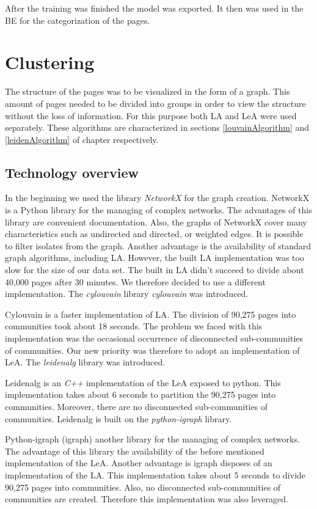 After the training was finished the model was exported. It then was used in the BE for the categorization of the pages.

\section{Clustering}\label{ClusteringDevelopment}
The structure of the pages was to be visualized in the form of a graph. This amount of pages needed to be divided into groups in order to view the structure without the loss of information. For this purpose both LA and LeA were used separately. These algorithms are characterized in sections \ref{louvainAlgorithm} and \ref{leidenAlgorithm} of chapter respectively. 

\subsection{Technology overview} \label{ClusteringTechonologyOverview}
In the beginning we used the library \textit{NetworkX} \cite{networkX} for the graph creation. NetworkX is a Python library for the managing of complex networks. The advantages of this library are convenient documentation. Also, the graphs of NetworkX cover many characteristics such as undirected and directed, or weighted edges. It is possible to filter isolates from the graph.  Another advantage is the availability of standard graph algorithms, including LA. However, the built LA implementation was too slow for the size of our data set. The built in LA didn't succeed to divide about 40,000 pages after 30 minutes. We therefore decided to use a different implementation. The \textit{cylouvain} library \textit{cylouvain} was introduced. 

Cylouvain is a faster implementation of LA. The division of 90,275 pages into communities took about 18 seconds. The problem we faced with this implementation was the occasional occurrence of disconnected sub-communities of communities. Our new priority was therefore to adopt an implementation of LeA. The \textit{leidenalg} \cite{leidenalg} library was introduced.

Leidenalg is an \textit{C++} implementation of the LeA exposed to python. This implementation takes about 6 seconds to partition the 90,275 pages into communities. Moreover, there are no disconnected sub-communities of communities. Leidenalg is built on the \textit{python-igraph} library. 

Python-igraph (igraph) another library for the managing of complex networks. The advantage of this library the availability of the before mentioned implementation of the LeA. Another advantage is igraph disposes of an implementation of the LA. This implementation takes about 5 seconds to divide 90,275 pages into communities. Also, no disconnected sub-communities of communities are created. Therefore this implementation was also leveraged.

